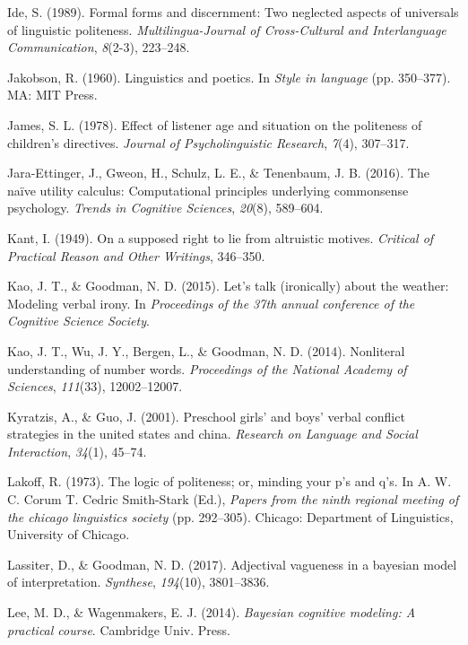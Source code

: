 \documentclass[oneside]{report}
\begin{document}
\hypertarget{ref-ide1989}{}
Ide, S. (1989). Formal forms and discernment: Two neglected aspects of
universals of linguistic politeness. \emph{Multilingua-Journal of
Cross-Cultural and Interlanguage Communication}, \emph{8}(2-3),
223--248.

\hypertarget{ref-jakobson1960}{}
Jakobson, R. (1960). Linguistics and poetics. In \emph{Style in
language} (pp. 350--377). MA: MIT Press.

\hypertarget{ref-james1978}{}
James, S. L. (1978). Effect of listener age and situation on the
politeness of children's directives. \emph{Journal of Psycholinguistic
Research}, \emph{7}(4), 307--317.

\hypertarget{ref-jara2016naive}{}
Jara-Ettinger, J., Gweon, H., Schulz, L. E., \& Tenenbaum, J. B. (2016).
The naïve utility calculus: Computational principles underlying
commonsense psychology. \emph{Trends in Cognitive Sciences},
\emph{20}(8), 589--604.

\hypertarget{ref-kant1949}{}
Kant, I. (1949). On a supposed right to lie from altruistic motives.
\emph{Critical of Practical Reason and Other Writings}, 346--350.

\hypertarget{ref-kao2015}{}
Kao, J. T., \& Goodman, N. D. (2015). Let's talk (ironically) about the
weather: Modeling verbal irony. In \emph{Proceedings of the 37th annual
conference of the Cognitive Science Society}.

\hypertarget{ref-kao2014}{}
Kao, J. T., Wu, J. Y., Bergen, L., \& Goodman, N. D. (2014). Nonliteral
understanding of number words. \emph{Proceedings of the National Academy
of Sciences}, \emph{111}(33), 12002--12007.

\hypertarget{ref-kyratzis2001}{}
Kyratzis, A., \& Guo, J. (2001). Preschool girls' and boys' verbal
conflict strategies in the united states and china. \emph{Research on
Language and Social Interaction}, \emph{34}(1), 45--74.

\hypertarget{ref-lakoff1973}{}
Lakoff, R. (1973). The logic of politeness; or, minding your p's and
q's. In A. W. C. Corum T. Cedric Smith-Stark (Ed.), \emph{Papers from
the ninth regional meeting of the chicago linguistics society} (pp.
292--305). Chicago: Department of Linguistics, University of Chicago.

\hypertarget{ref-lassiter2017adjectival}{}
Lassiter, D., \& Goodman, N. D. (2017). Adjectival vagueness in a
bayesian model of interpretation. \emph{Synthese}, \emph{194}(10),
3801--3836.

\hypertarget{ref-lee2014}{}
Lee, M. D., \& Wagenmakers, E. J. (2014). \emph{Bayesian cognitive
modeling: A practical course}. Cambridge Univ. Press.
\end{document}
